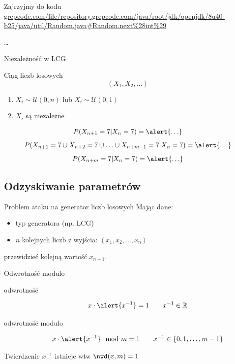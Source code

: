 \documentclass{mp}
\begin{document}
\begin{frame}{Zajrzyjmy do kodu}
\url{grepcode.com/file/repository.grepcode.com/java/root/jdk/openjdk/8u40-b25/java/util/Random.java\#Random.next\%28int\%29}
{
\small

\ldots

}
\end{frame}

\begin{frame}{Niezależność w LCG}
\begin{block}{Ciąg liczb losowych}
\[ (X_1, X_2, \ldots) \]
\begin{enumerate}
\item $X_i\sim\mathcal{U}(0,n)$  lub $X_i\sim\mathcal{U}(0,1)$
\item \alert{$X_i$ są niezależne}
\end{enumerate}
\end{block}
\[ P(X_{n+1}=7|X_n=7) = \alert{\ldots} \]
\pause
\[ P(X_{n+1}=7 \cup X_{n+2}=7 \cup \ldots \cup X_{n+m-1}=7|X_n=7) = \alert{\ldots} \]
\pause
\[ P(X_{n+m}=7|X_n=7) = \alert{\ldots} \]
\end{frame}

\subsection{Odzyskiwanie parametrów}
\begin{frame}{Problem ataku na generator liczb losowych}
Mając dane:
\begin{itemize}
\item typ generatora (np. LCG)
\item $n$ kolejnych liczb z wyjścia: $(x_1, x_2, \ldots, x_n)$
\end{itemize}
przewidzieć kolejną wartość $x_{n+1}$.
\end{frame}

\begin{frame}{Odwrotność modulo}
\begin{description}
\item[odwrotność] \[ x\cdot \alert{x^{-1}} = 1 \qquad x^{-1}\in\R \]
\pause
\item[odwrotność modulo] \[ x\cdot \alert{x^{-1}} \mod m = 1 \qquad x^{-1}\in \{0,1,\ldots, m-1\} \]
\end{description}
\pause
\begin{block}{Twierdzenie}
$x^{-1}$ istnieje wtw $\nwd(x, m)=1$
\end{block}
\end{frame}
\end{document}
